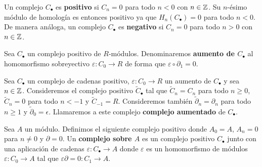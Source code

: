 \begin{definicion}
	Un complejo \(C_{\bullet}\) es \textbf{positivo} si \(C_{n}= 0\) para todo \(n < 0\)
	con \(n \in \mathbb{Z}\). Su \(n\)-ésimo módulo de homología es entonces positivo ya que \(H
	_{n}(C_{\bullet}) = 0\) para todo \(n < 0\). De manera análoga, un complejo \(C_{\bullet}\)
	es \textbf{negativo} si \(C_{n}= 0\) para todo \(n > 0\) con \(n \in \mathbb{Z}\).
\end{definicion}
%

\begin{definicion}
	Sea \(C_{\bullet}\) un complejo positivo de \(R\)-módulos. Denominaremos \textbf{aumento
		de \(C_{\bullet}\)} al homomorfismo sobreyectivo \(\varepsilon : C_{0}\to R\) de forma
	que \(\varepsilon \circ \partial_{1}= 0\).
\end{definicion}

\begin{definicion}
	Sea \(C_{\bullet}\) un complejo de cadenas positivo, \(\varepsilon : C_{0}\to R\)
	un aumento de \(C_{\bullet}\) y sea \(n \in \mathbb{Z}\). Consideremos el complejo positivo
	\(\widetilde{C}_{\bullet}\) tal que \(\widetilde{C}_{n}= C_{n}\) para todo \(n \geq
	0\), \(\widetilde{C}_{n}= 0\) para todo \(n < -1\) y \(\widetilde{C}_{-1}=R\). Consideremos
	también \(\widetilde{\partial}_{n}= \partial_{n}\) para todo \(n \geq 1\) y \(\widetilde
	{\partial}_{0}= \epsilon\). Llamaremos a este complejo \textbf{complejo
		aumentado} de \(C_{\bullet}\).
\end{definicion}
%

\begin{definicion}
	Sea \(A\) un módulo. Definimos el siguiente complejo positivo donde \(A_{0}= A\), \(A
	_{n}= 0\) para \(n \neq 0\) y \(\partial = 0\). Un \textbf{complejo sobre \(A\)} es un
	complejo positivo \(C_{\bullet}\) junto con una aplicación de cadenas \(\varepsilon
	: C_{\bullet}\to A\) donde \(\varepsilon\) es un homomorfismo de módulos \(\varepsilon
	: C_{0}\to A\) tal que \(\varepsilon \partial = 0: C_{1}\to A\).
\end{definicion}


